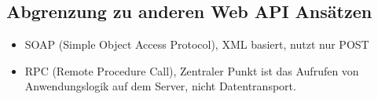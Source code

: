 \subsection{Abgrenzung zu anderen Web API Ansätzen}
\begin{itemize}
  \item SOAP (Simple Object Access Protocol), XML basiert, nutzt nur POST
  \item RPC (Remote Procedure Call), Zentraler Punkt ist das Aufrufen von Anwendungslogik auf dem Server, nicht Datentransport.
\end{itemize}
